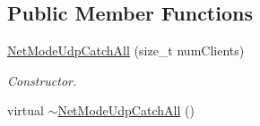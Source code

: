 \subsection*{Public Member Functions}
\begin{DoxyCompactItemize}
\item 
\hyperlink{class_net_mode_udp_catch_all_a9931877b6d191a2876232edd36c2fc50}{NetModeUdpCatchAll} (size\_\-t numClients)
\begin{DoxyCompactList}\small\item\em Constructor. \item\end{DoxyCompactList}\item 
\hypertarget{class_net_mode_udp_catch_all_a357692e773b7b3d68f8a412f28d09cc4}{
virtual \hyperlink{class_net_mode_udp_catch_all_a357692e773b7b3d68f8a412f28d09cc4}{$\sim$NetModeUdpCatchAll} ()}
\label{class_net_mode_udp_catch_all_a357692e773b7b3d68f8a412f28d09cc4}


\end{DoxyCompactItemize}

